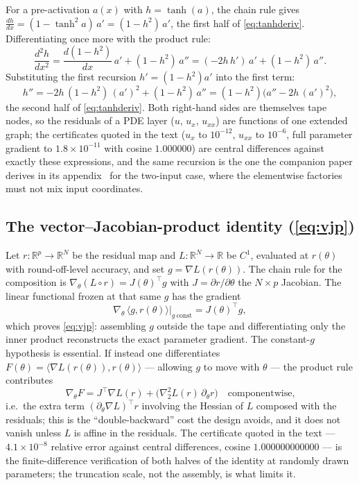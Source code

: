 \documentclass[11pt,a4paper]{article}
\theoremstyle{plain}
\theoremstyle{definition}
\begin{document}
For a pre-activation $a(x)$ with $h=\tanh(a)$, the chain rule gives
$\frac{dh}{dx}=(1-\tanh^2 a)\,a'=(1-h^2)\,a'$, the first half of
\eqref{eq:tanhderiv}. Differentiating once more with the product rule:
\[
\frac{d^2h}{dx^2}
=\frac{d(1-h^2)}{dx}\,a' + (1-h^2)\,a''
=(-2h\,h')\,a' + (1-h^2)\,a'' .
\]
Substituting the first recursion $h'=(1-h^2)a'$ into the first term:
\[
h''=-2h\,(1-h^2)\,(a')^2+(1-h^2)\,a''
=(1-h^2)\bigl(a''-2h\,(a')^2\bigr),
\]
the second half of \eqref{eq:tanhderiv}. Both right-hand sides are
themselves tape nodes, so the residuals of a PDE layer ($u$, $u_x$,
$u_{xx}$) are functions of one extended graph; the certificates quoted in
the text ($u_x$ to $10^{-12}$, $u_{xx}$ to $10^{-6}$, full parameter
gradient to $1.8\times10^{-11}$ with cosine $1.000000$) are central
differences against exactly these expressions, and the same recursion is
the one the companion paper derives in its
appendix~\cite{alvarez2026pinn} for the two-input case, where the
elementwise factories must not mix input coordinates.

\subsection{The vector--Jacobian-product identity \texorpdfstring{(\eqref{eq:vjp})}{}}
\label{app:vjp}

Let $r:\mathbb{R}^p\to\mathbb{R}^N$ be the residual map and
$L:\mathbb{R}^N\to\mathbb{R}$ be $C^1$, evaluated at
$r(\theta)$ with round-off-level accuracy, and set $g=\nabla L(r(\theta))$.
The chain rule for the composition is
$\nabla_\theta (L\circ r)=J(\theta)^{\!\top} g$ with
$J=\partial r/\partial\theta$ the $N\times p$ Jacobian. The linear
functional frozen at that same $g$ has the gradient
\[
\nabla_\theta\,\langle g, r(\theta)\rangle\Big|_{g\ \mathrm{const}}
=J(\theta)^{\!\top} g ,
\]
which proves \eqref{eq:vjp}: assembling $g$ outside the tape and
differentiating only the inner product reconstructs the exact parameter
gradient. The constant-$g$ hypothesis is essential. If instead one
differentiates $F(\theta)=\langle \nabla L(r(\theta)), r(\theta)\rangle$
--- allowing $g$ to move with $\theta$ --- the product rule contributes
\[
\nabla_\theta F
=J^{\!\top}\nabla L(r)
+\big(\nabla^2_2 L(r)\,\partial_\theta r\big)\quad\text{componentwise,}
\]
i.e.\ the extra term $(\partial_\theta\nabla L)^{\!\top}r$ involving the
Hessian of $L$ composed with the residuals; this is the
``double-backward'' cost the design avoids, and it does not vanish
unless $L$ is affine in the residuals. The certificate quoted in the text
--- $4.1\times10^{-8}$ relative error against central differences,
cosine $1.000000000000$ --- is the finite-difference verification of both
halves of the identity at randomly drawn parameters; the truncation
scale, not the assembly, is what limits it.
\end{document}
